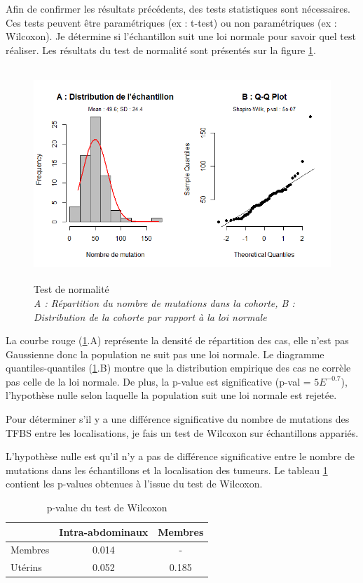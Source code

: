 Afin de confirmer les résultats précédents, des tests statistiques sont nécessaires. Ces tests peuvent être paramétriques (ex : t-test) ou non paramétriques (ex : Wilcoxon). Je détermine si l'échantillon suit une loi normale pour savoir quel test réaliser. Les résultats du test de normalité sont présentés sur la figure \ref{fig:shap}. 

\begin{figure}[h]
\centering
\includegraphics[width=15cm,height=8cm]{Figures/shapiro.png}
\captionsetup{justification=centering}
\caption{Test de normalité \\ 
\textit{A : Répartition du nombre de mutations dans la cohorte, B : Distribution de la cohorte par rapport à la loi normale}}
\label{fig:shap}
\end{figure}

La courbe rouge (\ref{fig:shap}.A) représente la densité de répartition des cas, elle n'est pas Gaussienne donc la population ne suit pas une loi normale. Le diagramme quantiles-quantiles (\ref{fig:shap}.B) montre que la distribution empirique des cas ne corrèle pas celle de la loi normale. De plus, la p-value est significative (p-val = $5E^{-0.7}$), l'hypothèse nulle selon laquelle la population suit une loi normale est rejetée.

Pour déterminer s'il y a une différence significative du nombre de mutations des TFBS entre les localisations, je fais un test de Wilcoxon sur échantillons appariés.

L'hypothèse nulle est qu'il n'y a pas de différence significative entre le nombre de mutations dans les échantillons et la localisation des tumeurs. Le tableau \ref{tab:wilc} contient les p-values obtenues à l'issue du test de Wilcoxon.

\begin{table}[h]
\centering
\begin{tabular}{l|c|c|}
\cline{2-3} & Intra-abdominaux & Membres\\
\hline
\multicolumn{1}{|l|}{Membres} & 0.014 & - \\
\hline
\multicolumn{1}{|l|}{Utérins}  & 0.052 & 0.185 \\
\hline
\end{tabular}
\caption{p-value du test de Wilcoxon}
\label{tab:wilc}
\end{table}

